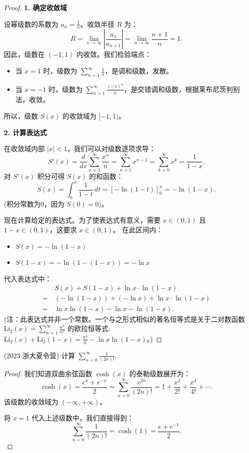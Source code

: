 \documentclass[lang=cn,10pt,thmcnt=section]{elegantbook}
\begin{document}
	\begin{proof}
		\textbf{1. 确定收敛域}
		
		设幂级数的系数为 $a_n = \frac{1}{n}$。收敛半径 $R$ 为：
		\[ R = \lim_{n \to \infty} \left| \frac{a_n}{a_{n+1}} \right| = \lim_{n \to \infty} \frac{n+1}{n} = 1. \]
		因此，级数在 $(-1, 1)$ 内收敛。我们检验端点：
		\begin{itemize}
			\item 当 $x=1$ 时，级数为 $\sum_{n=1}^\infty \frac{1}{n}$，是调和级数，发散。
			\item 当 $x=-1$ 时，级数为 $\sum_{n=1}^\infty \frac{(-1)^n}{n}$，是交错调和级数，根据莱布尼茨判别法，收敛。
		\end{itemize}
		所以，级数 $S(x)$ 的收敛域为 $[-1, 1)$。
		
		\textbf{2. 计算表达式}
		
		在收敛域内部 $|x|<1$，我们可以对级数逐项求导：
		\[ S'(x) = \frac{d}{dx} \sum_{n=1}^\infty \frac{x^n}{n} = \sum_{n=1}^\infty x^{n-1} = \sum_{k=0}^\infty x^k = \frac{1}{1-x}. \]
		对 $S'(x)$ 积分可得 $S(x)$ 的和函数：
		\[ S(x) = \int_0^x \frac{1}{1-t} \, dt = [-\ln(1-t)]_0^x = -\ln(1-x). \]
		(积分常数为0，因为 $S(0)=0$)。
		
		现在计算给定的表达式。为了使表达式有意义，需要 $x \in (0,1)$ 且 $1-x \in (0,1)$，这要求 $x \in (0,1)$。
		在此区间内：
		\begin{itemize}
			\item $S(x) = -\ln(1-x)$
			\item $S(1-x) = -\ln(1-(1-x)) = -\ln x$
		\end{itemize}
		代入表达式中：
		\begin{align*}
			& S(x) + S(1-x) + \ln x \cdot \ln(1-x) \\
			=\ & (-\ln(1-x)) + (-\ln x) + \ln x \cdot \ln(1-x) \\
			=\ & \ln x \ln(1-x) - \ln x - \ln(1-x).
		\end{align*}
		(注：此表达式并非一个常数。一个与之形式相似的著名恒等式是关于二对数函数 $\text{Li}_2(x) = \sum_{n=1}^\infty \frac{x^n}{n^2}$ 的欧拉恒等式: $\text{Li}_2(x) + \text{Li}_2(1-x) = \frac{\pi^2}{6} - \ln x \ln(1-x)$。)
	\end{proof}
	\begin{example}
	(2023 浙大夏令营) 计算 $\sum_{n=0}^{\infty} \frac{1}{(2n)!}$.
	\end{example}
	\begin{proof}
		我们知道双曲余弦函数 $\cosh(x)$ 的泰勒级数展开为：
		\[ \cosh(x) = \frac{e^x + e^{-x}}{2} = \sum_{n=0}^\infty \frac{x^{2n}}{(2n)!} = 1 + \frac{x^2}{2!} + \frac{x^4}{4!} + \cdots. \]
		该级数的收敛域为 $(-\infty, +\infty)$。
		
		将 $x=1$ 代入上述级数中，我们直接得到：
		\[ \sum_{n=0}^{\infty} \frac{1}{(2n)!} = \cosh(1) = \frac{e + e^{-1}}{2}. \]
	\end{proof}
	
\end{document}
